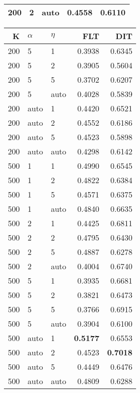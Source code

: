 \begin{table}
\begin{spacing}{1.2}
{\begin{tabular}{rll|rr}
 200 &     2 &  auto &           0.4558 & 0.6110 \\
\bottomrule
\end{tabular}
} \hfill \parbox{.45\linewidth}{\centering \begin{tabular}{rll|rr}
\toprule
   K & $\alpha$ &   $\eta$ & FLT &       DIT \\
\midrule
 200 &     5 &     1 &           0.3938 &       0.6345 \\
 200 &     5 &     2 &           0.3905 &       0.5604 \\
 200 &     5 &     5 &           0.3702 &       0.6207 \\
 200 &     5 &  auto &           0.4028 &       0.5839 \\
 200 &  auto &     1 &           0.4420 &       0.6521 \\
 200 &  auto &     2 &           0.4552 &       0.6186 \\
 200 &  auto &     5 &           0.4523 &       0.5898 \\
 200 &  auto &  auto &           0.4298 &       0.6142 \\
 500 &     1 &     1 &           0.4990 &       0.6545 \\
 500 &     1 &     2 &           0.4822 &       0.6384 \\
 500 &     1 &     5 &           0.4571 &       0.6375 \\
 500 &     1 &  auto &           0.4840 &       0.6635 \\
 500 &     2 &     1 &           0.4425 &       0.6811 \\
 500 &     2 &     2 &           0.4795 &       0.6430 \\
 500 &     2 &     5 &           0.4887 &       0.6278 \\
 500 &     2 &  auto &           0.4004 &       0.6740 \\
 500 &     5 &     1 &           0.3935 &       0.6681 \\
 500 &     5 &     2 &           0.3821 &       0.6473 \\
 500 &     5 &     5 &           0.3766 &       0.6915 \\
 500 &     5 &  auto &           0.3904 &       0.6100 \\
 500 &  auto &     1 &     {\bf 0.5177} &       0.6553 \\
 500 &  auto &     2 &           0.4523 & {\bf 0.7018} \\
 500 &  auto &     5 &           0.4449 &       0.6476 \\
 500 &  auto &  auto &           0.4809 &       0.6288 \\
\bottomrule
\end{tabular}
}
\end{spacing}
\end{table}
